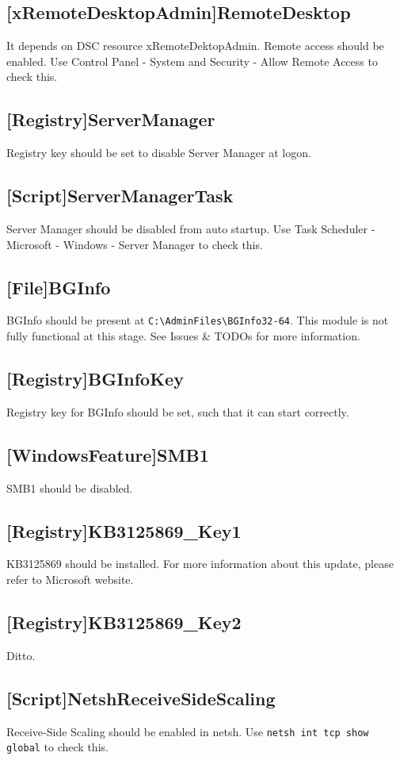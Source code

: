     \subsection{[xRemoteDesktopAdmin]RemoteDesktop}
      It depends on DSC resource xRemoteDektopAdmin. Remote access should be enabled. Use Control Panel - System and Security - Allow Remote Access to check this.
    \subsection{[Registry]ServerManager}
      Registry key should be set to disable Server Manager at logon.
    \subsection{[Script]ServerManagerTask}
      Server Manager should be disabled from auto startup. Use Task Scheduler - Microsoft - Windows - Server Manager to check this.
    \subsection{[File]BGInfo}
      BGInfo should be present at \verb^C:\AdminFiles\BGInfo32-64^. This module is not fully functional at this stage. See Issues \& TODOs for more information.
    \subsection{[Registry]BGInfoKey}
      Registry key for BGInfo should be set, such that it can start correctly.
    \subsection{[WindowsFeature]SMB1}
      SMB1 should be disabled.
    \subsection{[Registry]KB3125869\_Key1}
      KB3125869 should be installed. For more information about this update, please refer to Microsoft website.
    \subsection{[Registry]KB3125869\_Key2}
      Ditto.
    \subsection{[Script]NetshReceiveSideScaling}
      Receive-Side Scaling should be enabled in netsh. Use \verb^netsh int tcp show global^ to check this.

